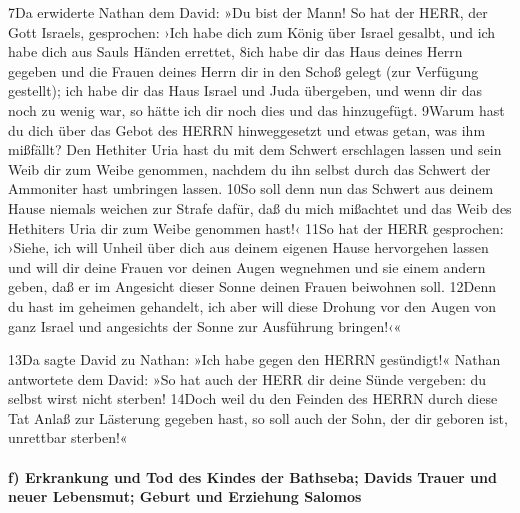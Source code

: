 7Da erwiderte Nathan dem David: »Du bist der Mann! So hat der HERR, der
Gott Israels, gesprochen: ›Ich habe dich zum König über Israel gesalbt,
und ich habe dich aus Sauls Händen errettet, 8ich habe dir das Haus
deines Herrn gegeben und die Frauen deines Herrn dir in den Schoß gelegt
(zur Verfügung gestellt); ich habe dir das Haus Israel und Juda
übergeben, und wenn dir das noch zu wenig war, so hätte ich dir noch
dies und das hinzugefügt. 9Warum hast du dich über das Gebot des HERRN
hinweggesetzt und etwas getan, was ihm mißfällt? Den Hethiter Uria hast
du mit dem Schwert erschlagen lassen und sein Weib dir zum Weibe
genommen, nachdem du ihn selbst durch das Schwert der Ammoniter hast
umbringen lassen. 10So soll denn nun das Schwert aus deinem Hause
niemals weichen zur Strafe dafür, daß du mich mißachtet und das Weib des
Hethiters Uria dir zum Weibe genommen hast!‹ 11So hat der HERR
gesprochen: ›Siehe, ich will Unheil über dich aus deinem eigenen Hause
hervorgehen lassen und will dir deine Frauen vor deinen Augen wegnehmen
und sie einem andern geben, daß er im Angesicht dieser Sonne deinen
Frauen beiwohnen soll. 12Denn du hast im geheimen gehandelt, ich aber
will diese Drohung vor den Augen von ganz Israel und angesichts der
Sonne zur Ausführung bringen!‹«

13Da sagte David zu Nathan: »Ich habe gegen den HERRN gesündigt!« Nathan
antwortete dem David: »So hat auch der HERR dir deine Sünde vergeben: du
selbst wirst nicht sterben! 14Doch weil du den Feinden des HERRN durch
diese Tat Anlaß zur Lästerung gegeben hast, so soll auch der Sohn, der
dir geboren ist, unrettbar sterben!«

\hypertarget{f-erkrankung-und-tod-des-kindes-der-bathseba-davids-trauer-und-neuer-lebensmut-geburt-und-erziehung-salomos}{%
\paragraph{f) Erkrankung und Tod des Kindes der Bathseba; Davids Trauer
und neuer Lebensmut; Geburt und Erziehung
Salomos}\label{f-erkrankung-und-tod-des-kindes-der-bathseba-davids-trauer-und-neuer-lebensmut-geburt-und-erziehung-salomos}}

